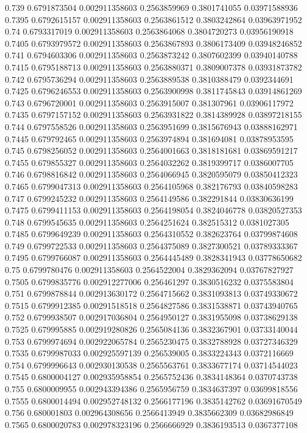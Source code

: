 {0.739 0.6791873504 0.002911358603 0.2563859969 0.3801741055 0.03971588936
0.7395 0.6792615157 0.002911358603 0.2563861512 0.3803242864 0.03963971952
0.74 0.6793317019 0.002911358603 0.2563864068 0.3804720273 0.03956190918
0.7405 0.6793979572 0.002911358603 0.2563867893 0.3806173409 0.03948246852
0.741 0.6794603306 0.002911358603 0.2563873242 0.3807602399 0.03940140788
0.7415 0.6795188713 0.002911358603 0.2563880371 0.3809007378 0.03931873782
0.742 0.6795736294 0.002911358603 0.2563889538 0.3810388479 0.0392344691
0.7425 0.6796246553 0.002911358603 0.2563900998 0.3811745843 0.03914861269
0.743 0.6796720001 0.002911358603 0.2563915007 0.381307961 0.03906117972
0.7435 0.6797157152 0.002911358603 0.2563931822 0.3814389928 0.03897218155
0.744 0.6797558526 0.002911358603 0.2563951699 0.3815676943 0.03888162971
0.7445 0.679792465 0.002911358603 0.2563974894 0.381694081 0.03878953595
0.745 0.6798256052 0.002911358603 0.2564001663 0.3818181681 0.03869591217
0.7455 0.679855327 0.002911358603 0.2564032262 0.3819399717 0.0386007705
0.746 0.6798816842 0.002911358603 0.2564066945 0.3820595079 0.03850412323
0.7465 0.6799047313 0.002911358603 0.2564105968 0.382176793 0.03840598283
0.747 0.6799245232 0.002911358603 0.2564149586 0.382291844 0.03830636199
0.7475 0.6799411153 0.002911358603 0.2564198054 0.3824046778 0.03820527353
0.748 0.6799545635 0.002911358603 0.2564251624 0.382515312 0.0381027305
0.7485 0.6799649239 0.002911358603 0.2564310552 0.382623764 0.03799874608
0.749 0.6799722533 0.002911358603 0.2564375089 0.3827300521 0.03789333367
0.7495 0.6799766087 0.002911358603 0.2564445489 0.3828341943 0.03778650682
0.75 0.6799780476 0.002911358603 0.2564522004 0.3829362094 0.03767827927
0.7505 0.6799835776 0.002912277006 0.256461297 0.3830516232 0.0375583804
0.751 0.6799878844 0.002913630172 0.2564715662 0.3831093813 0.03749330672
0.7515 0.6799912385 0.00291518518 0.2564827586 0.3831538871 0.03743940765
0.752 0.6799938507 0.002917036804 0.2564950127 0.3831955098 0.03738629138
0.7525 0.679995885 0.002919280826 0.2565084136 0.3832367901 0.03733140044
0.753 0.6799974694 0.002922065784 0.2565230475 0.3832788928 0.03727346329
0.7535 0.6799987033 0.002925597139 0.256539005 0.3833224343 0.0372116669
0.754 0.6799996643 0.002930130538 0.2565563761 0.3833677174 0.03714544023
0.7545 0.6800004127 0.002935958854 0.2565752436 0.3834148364 0.0370743738
0.755 0.6800009955 0.002943394386 0.2565956759 0.3834637397 0.03699818556
0.7555 0.6800014494 0.002952748132 0.2566177196 0.3835142762 0.03691670549
0.756 0.680001803 0.002964308656 0.2566413949 0.3835662309 0.03682986849
0.7565 0.6800020783 0.002978323196 0.2566666929 0.3836193513 0.0367377108
}
